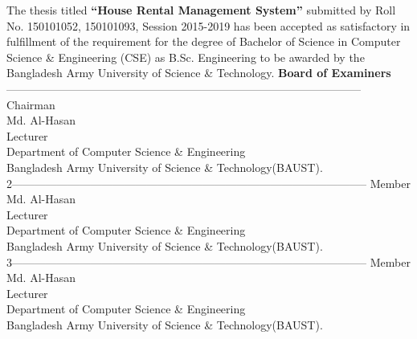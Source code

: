 \documentclass[12pt,a4paper]{article}
\begin{document}
\begin{titlepage}
	{\RaggedRight \justify The thesis titled \textbf{“House Rental Management System”} submitted by Roll No. 150101052, 150101093, Session 2015-2019 has been accepted as satisfactory in fulfillment of the requirement for the degree of Bachelor of Science in Computer Science \& Engineering (CSE) as B.Sc. Engineering to be awarded by the Bangladesh Army University of Science \& Technology.}
	{\center
	\vspace{.3in}
	{\fontsize{16}{10}\selectfont\textbf{Board of Examiners}}\\
	\vspace{.5in}}
	----------------------------------------------------------------------------------------------- \hspace{5em} Chairman\\
	Md. Al-Hasan\\
	Lecturer\\
	Department of Computer Science \& Engineering\\
	Bangladesh Army University of Science \& Technology(BAUST).
	\vspace{1in}\\
2----------------------------------------------------------------------------------------------- \hspace{5em} Member\\
	Md. Al-Hasan\\
	Lecturer\\
	Department of Computer Science \& Engineering\\
	Bangladesh Army University of Science \& Technology(BAUST).\vspace{1in}\\
3----------------------------------------------------------------------------------------------- \hspace{5em} Member\\
	Md. Al-Hasan\\
	Lecturer\\
	Department of Computer Science \& Engineering\\
	Bangladesh Army University of Science \& Technology(BAUST).	
\end{titlepage}
\end{document}
